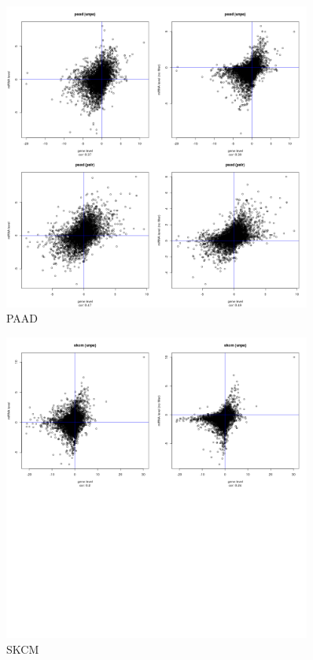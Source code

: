 \documentclass[a4paper,12pt]{article}
\begin{document}
\newpage

\begin{figure}[!h] 
\centering 
\includegraphics[width=0.9\textwidth]{plots/gene_vs_mirna_level_gsa_paad.png} 
\caption{PAAD} 
\end{figure} 

\newpage

\begin{figure}[!h] 
\centering 
\includegraphics[width=0.9\textwidth]{plots/gene_vs_mirna_level_gsa_skcm.png} 
\caption{SKCM} 
\end{figure} 
\end{document}
